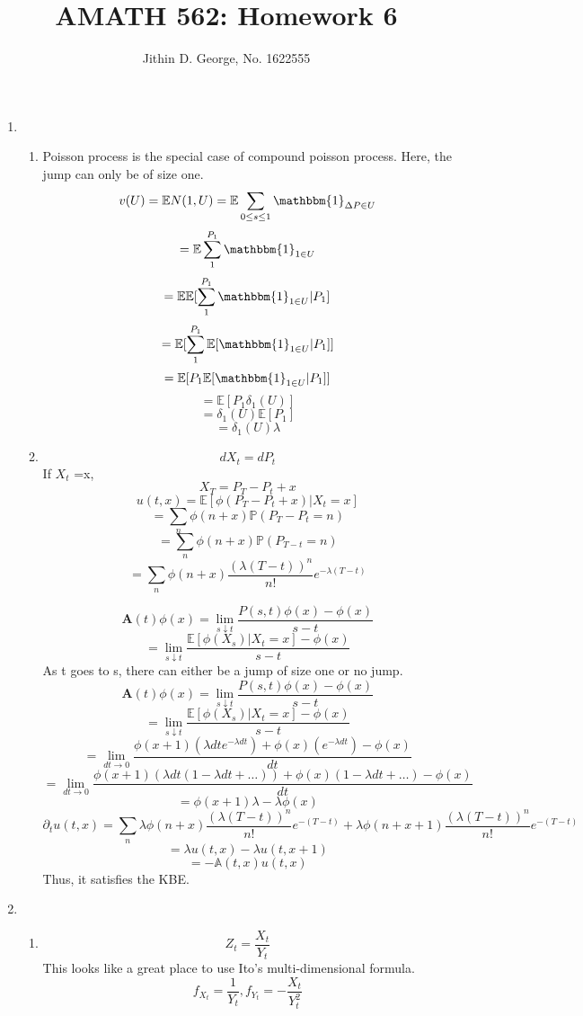\documentclass[a4paper,11pt]{article}
\title{AMATH 562: Homework 6}
\author{Jithin D. George, No. 1622555}
\begin{document}
\maketitle
\begin{enumerate}

\item 
\begin{enumerate}
 \item
         Poisson process is the special case of compound poisson process. Here, the jump can only be of size one.
         \[v(U) = \mathbb{E}N(1,U) =\mathbb{E} \sum_{0\leq s \leq 1 } \mathbbm{1}_{\Delta P \in U} \]
         \[= \mathbb{E}\sum_{1 }^{P_1} \mathbbm{1}_{1 \in U} \]
                 \[= \mathbb{E}\mathbb{E}[\sum_{1 }^{P_1} \mathbbm{1}_{1 \in U}|P_1] \]
                                  \[= \mathbb{E}[\sum_{1 }^{P_1} \mathbb{E}[\mathbbm{1}_{1 \in U}|P_1]] \]
                                  \[= \mathbb{E}[ P_1 \mathbb{E}[\mathbbm{1}_{1 \in U}|P_1]] \]
     \[= \mathbb{E} [P_1 \delta_1(U)] \]    
        \[= \delta_1(U) \mathbb{E} [P_1 ] \] 
        \[= \delta_1(U) \lambda\] 
\item

\[dX_t = dP_t\]
If $X_t$ =x,
\[X_T = P_T- P_t+x\]
\[u(t,x) = \mathbb{E}[\phi(P_T- P_t+x)|X_t=x]\]
\[ = \sum_n\phi(n+x) \mathbb{P}(P_T- P_t=n)\]
\[ = \sum_n\phi(n+x) \mathbb{P}(P_{T-t}=n)\]
\[ = \sum_n\phi(n+x) \frac{(\lambda (T-t))^n}{n!}e^{-\lambda (T-t)}\]

\[\mathbf{A}(t)\phi(x) = \lim_{s\downarrow t} \frac{P(s,t)\phi(x)-\phi(x)}{s-t}\]
\[= \lim_{s\downarrow t} \frac{\mathbb{E}[\phi(X_s)|X_t=x]-\phi(x)}{s-t}\]
As t goes to s, there can either be a jump of size one or no jump.
\[\mathbf{A}(t)\phi(x) = \lim_{s\downarrow t} \frac{P(s,t)\phi(x)-\phi(x)}{s-t}\]
\[= \lim_{s\downarrow t} \frac{\mathbb{E}[\phi(X_s)|X_t=x]-\phi(x)}{s-t}\]
\[= \lim_{dt \to 0} \frac{\phi(x+1)(\lambda dt e^{-\lambda dt})+\phi(x)(e^{-\lambda dt})-\phi(x)}{dt}\]
  \[= \lim_{dt \to 0} \frac{\phi(x+1)(\lambda dt (1-\lambda dt+\ldots) )+\phi(x)(1-\lambda dt+\ldots) -\phi(x)}{dt}\]      
    \[= \phi(x+1)\lambda -\lambda \phi(x)\] 
    \[\partial_t u(t,x) = \sum_n \lambda \phi(n+x) \frac{(\lambda (T-t))^n}{n!}e^{- (T-t)}+ \lambda \phi(n+x+1) \frac{(\lambda (T-t))^n}{n!}e^{- (T-t)}\]
    \[= \lambda u(t,x) - \lambda u(t,x+1)\]
    \[= -\mathbb{A}(t,x) u(t,x) \]
    Thus, it satisfies the KBE.
 
 
\end{enumerate}
\item 
\begin{enumerate}
 \item 
  \[Z_t = \frac{X_t}{Y_t}\]
This looks like a great place to use Ito's multi-dimensional formula.
\[f_{X_t} = \frac{1}{Y_t},f_{Y_t} = -\frac{X_t}{Y_t^2}\]


\end{enumerate}
\end{enumerate}
\end{document}
